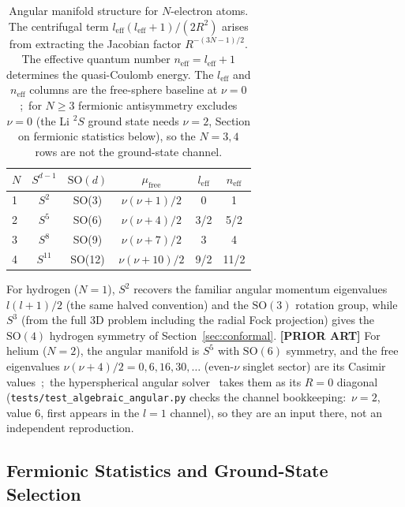 \documentclass[aps,pra,twocolumn,superscriptaddress,longbibliography]{revtex4-2}
\begin{document}
\begin{table}[h]
\caption{Angular manifold structure for $N$-electron atoms.
The centrifugal term $l_{\mathrm{eff}}(l_{\mathrm{eff}}+1)/(2R^2)$
arises from extracting the Jacobian factor $R^{-(3N-1)/2}$.
The effective quantum number $n_{\mathrm{eff}} = l_{\mathrm{eff}} + 1$
determines the quasi-Coulomb energy.  The $l_{\mathrm{eff}}$ and
$n_{\mathrm{eff}}$ columns are the free-sphere baseline at $\nu = 0$;\
for $N \ge 3$ fermionic antisymmetry excludes $\nu = 0$ (the Li ${}^2S$
ground state needs $\nu = 2$, Section on fermionic statistics below),
so the $N = 3, 4$ rows are not the ground-state channel.}
\label{tab:N_electron}
\begin{ruledtabular}
\begin{tabular}{lccccc}
  $N$ & $S^{d-1}$ & $\mathrm{SO}(d)$ & $\mu_{\mathrm{free}}$
  & $l_{\mathrm{eff}}$ & $n_{\mathrm{eff}}$ \\
  \hline
  1 & $S^2$ & SO(3) & $\nu(\nu+1)/2$   & 0   & 1 \\
  2 & $S^5$ & SO(6) & $\nu(\nu+4)/2$   & 3/2 & 5/2 \\
  3 & $S^8$ & SO(9) & $\nu(\nu+7)/2$   & 3   & 4 \\
  4 & $S^{11}$ & SO(12) & $\nu(\nu+10)/2$ & 9/2 & 11/2 \\
\end{tabular}
\end{ruledtabular}
\end{table}

For hydrogen ($N = 1$), $S^2$ recovers the familiar angular momentum
eigenvalues $l(l+1)/2$ (the same halved convention) and the $\mathrm{SO}(3)$ rotation group, while
$S^3$ (from the full 3D problem including the radial Fock projection)
gives the $\mathrm{SO}(4)$ hydrogen symmetry of Section~\ref{sec:conformal}.
\textbf{[PRIOR ART]} For helium ($N = 2$), the angular manifold is $S^5$ with
$\mathrm{SO}(6)$ symmetry, and the free eigenvalues
$\nu(\nu+4)/2 = 0, 6, 16, 30, \ldots$ (even-$\nu$ singlet sector) are its
Casimir values~\cite{avery1989};\ the hyperspherical angular
solver~\cite{loutey_paper13} takes them as its $R = 0$ diagonal
(\texttt{tests/test\_algebraic\_angular.py} checks the channel bookkeeping:\
$\nu = 2$, value $6$, first appears in the $l = 1$ channel), so they are
an input there, not an independent reproduction.

\subsection{Fermionic Statistics and Ground-State Selection}
\end{document}
